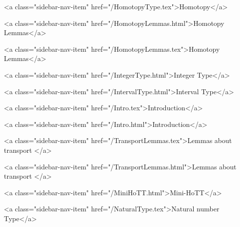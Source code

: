       
    
      
        
          <a class="sidebar-nav-item" href="/HomotopyType.tex">Homotopy</a>
        
      
    
      
        
          <a class="sidebar-nav-item" href="/HomotopyLemmas.html">Homotopy Lemmas</a>
        
      
    
      
        
          <a class="sidebar-nav-item" href="/HomotopyLemmas.tex">Homotopy Lemmas</a>
        
      
    
      
        
          <a class="sidebar-nav-item" href="/IntegerType.html">Integer Type</a>
        
      
    
      
        
          <a class="sidebar-nav-item" href="/IntervalType.html">Interval Type</a>
        
      
    
      
        
          <a class="sidebar-nav-item" href="/Intro.tex">Introduction</a>
        
      
    
      
        
          <a class="sidebar-nav-item" href="/Intro.html">Introduction</a>
        
      
    
      
        
          <a class="sidebar-nav-item" href="/TransportLemmas.tex">Lemmas about transport </a>
        
      
    
      
        
          <a class="sidebar-nav-item" href="/TransportLemmas.html">Lemmas about transport </a>
        
      
    
      
        
          <a class="sidebar-nav-item" href="/MiniHoTT.html">Mini-HoTT</a>
        
      
    
      
        
          <a class="sidebar-nav-item" href="/NaturalType.tex">Natural number Type</a>
        
